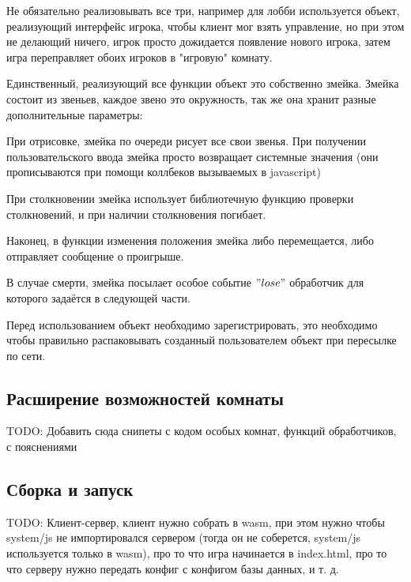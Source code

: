 \documentclass[a4paper,14pt, openany]{book}
\begin{document}
Не обязательно реализовывать все три, например для лобби используется объект, реализующий интерфейс игрока, чтобы клиент мог взять управление, но при этом не делающий ничего, игрок просто дожидается появление нового игрока, затем игра переправляет обоих игроков в "игровую" комнату.

Единственный, реализующий все функции объект это собственно змейка. Змейка состоит из звеньев, каждое звено это окружность, так же она хранит разные дополнительные параметры:


При отрисовке, змейка по очереди рисует все свои звенья. При получении пользовательского ввода змейка просто возвращает системные значения (они прописываются при помощи коллбеков вызываемых в javascript)


При столкновении змейка использует библиотечную функцию проверки столкновений, и при наличии столкновения погибает.

Наконец, в функции изменения положения змейка либо перемещается, либо отправляет сообщение о проигрыше. 



В случае смерти, змейка посылает особое событие $"lose"$ обработчик для которого задаётся в следующей части. 

Перед использованием объект необходимо зарегистрировать, это необходимо чтобы правильно распаковывать созданный пользователем объект при пересылке по сети. 



\subsection{Расширение возможностей комнаты}

TODO: Добавить сюда снипеты с кодом особых комнат, функций обработчиков, с пояснениями

\subsection{Сборка и запуск}

TODO: Клиент-сервер, клиент нужно собрать в wasm, при этом нужно чтобы system/js не импортировался сервером (тогда он не соберется, system/js используется только в wasm), про то что игра начинается в index.html, про то что серверу нужно передать конфиг с конфигом базы данных, и т. д.
\end{document}
